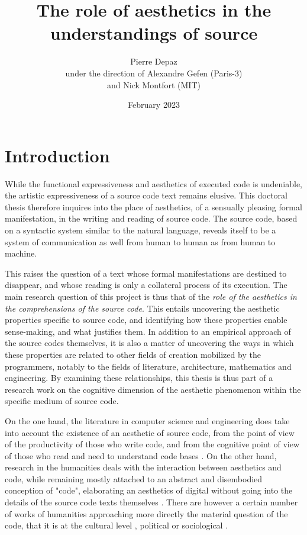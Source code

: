 \documentclass{article}
\begin{document}
\title{The role of aesthetics in the understandings of source}
\author{Pierre Depaz\\under the direction of Alexandre Gefen (Paris-3)\\and Nick Montfort (MIT)}
\date{February 2023}
\maketitle

\section{Introduction}

While the functional expressiveness and aesthetics of executed code is undeniable, the artistic expressiveness of a source code text remains elusive. This doctoral thesis therefore inquires into the place of aesthetics, of a sensually pleasing formal manifestation, in the writing and reading of source code. The source code, based on a syntactic system similar to the natural language, reveals itself to be a system of communication as well from human to human as from human to machine.

This raises the question of a text whose formal manifestations are destined to disappear, and whose reading is only a collateral process of its execution. The main research question of this project is thus that of the \emph{role of the aesthetics in the comprehensions of the source code}. This entails uncovering the aesthetic properties specific to source code, and identifying how these properties enable sense-making, and what justifies them. In addition to an empirical approach of the source codes themselves, it is also a matter of uncovering the ways in which these properties are related to other fields of creation mobilized by the programmers, notably to the fields of literature, architecture, mathematics and engineering. By examining these relationships, this thesis is thus part of a research work on the cognitive dimension of the aesthetic phenomenon within the specific medium of source code.

On the one hand, the literature in computer science and engineering does take into account the existence of an aesthetic of source code, from the point of view of the productivity of those who write code, and from the cognitive point of view of those who read and need to understand code bases \citep{oram_beautiful_2007,cox_programming_2009,gabriel_mob_2001,martin_clean_2008,detienne_software_2012,weinberg_psychology_1998}. On the other hand, research in the humanities deals with the interaction between aesthetics and code, while remaining mostly attached to an abstract and disembodied conception of "code", elaborating an aesthetics of digital without going into the details of the source code texts themselves \citep{cramer_exe_2019,hayles_my_2010,mackenzie_cutting_2006,levy_programming_1992}. There are however a certain number of works of humanities approaching more directly the material question of the code, that it is at the cultural level \citep{montfort_10_2014}, political \citep{cox_speaking_2013} or sociological \citep{paloque-berges_poetique_2009}.
\end{document}
